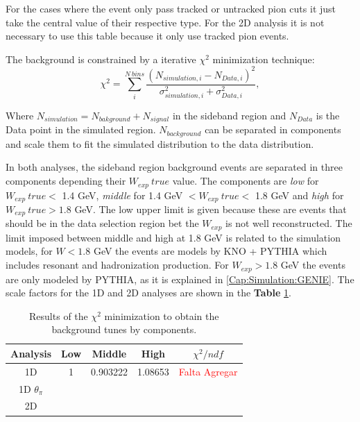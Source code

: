 For the cases where the event only pass tracked or untracked pion cuts it just take the central value of their respective type. For the 2D analysis it is not necessary to use this table because it only use tracked pion events. 

The background is constrained by a iterative $\chi^2$ minimization technique:
\begin{equation}
    \chi^2=\sum^{N\ bins}_i \frac{\left(N_{simulation,i}-N_{Data,i}\right)^2}{\sigma^2_{simulation,i}+\sigma^2_{Data,i}},
\end{equation}

Where $N_{simulation}=N_{bakground}+N_{signal}$ in the sideband region and $N_{Data}$ is the Data point in the simulated region. $N_{background}$  can be separated in components and scale them to fit the simulated distribution to the data distribution.  

In both analyses, the sideband region background events are separated in three components depending their $W_{exp}\ true$ value. The components are \textit{low} for $W_{exp}\ true<$ 1.4 GeV, \textit{middle} for 1.4 GeV $<W_{exp}\ true< $ 1.8 GeV and \textit{high} for $W_{exp}\ true > 1.8$ GeV. The low upper limit is given because these are events that should be in the data selection region bet the $W_{exp}$ is not well reconstructed. The limit imposed  between middle and high at 1.8 GeV is related to the simulation models, for $W < 1.8$ GeV the events are models by KNO + PYTHIA which includes resonant and hadronization production. For $W_{exp} > 1.8$ GeV the events are only modeled by PYTHIA, as it is explained in \ref{Cap:Simulation:GENIE}. The scale factors for the 1D and 2D analyses are shown in the \textbf{Table} \ref{tab:BgStudies:SidebandTunning:BGtunes}.

\begin{table}[!htb]
    \centering
    \begin{tabular}{c|c|c|c|c}
         Analysis & Low & Middle   &   High  & $\chi^2/ndf$ \\ \hline
         1D       & 1   & 0.903222 & 1.08653 & \textcolor{red}{Falta Agregar} \\
         1D $\theta_\pi$& & & & \\
         2D       &     &          &         &
    \end{tabular}
    \caption{Results of the $\chi^2$ minimization to obtain the background tunes by components.}
    \label{tab:BgStudies:SidebandTunning:BGtunes}
\end{table}

